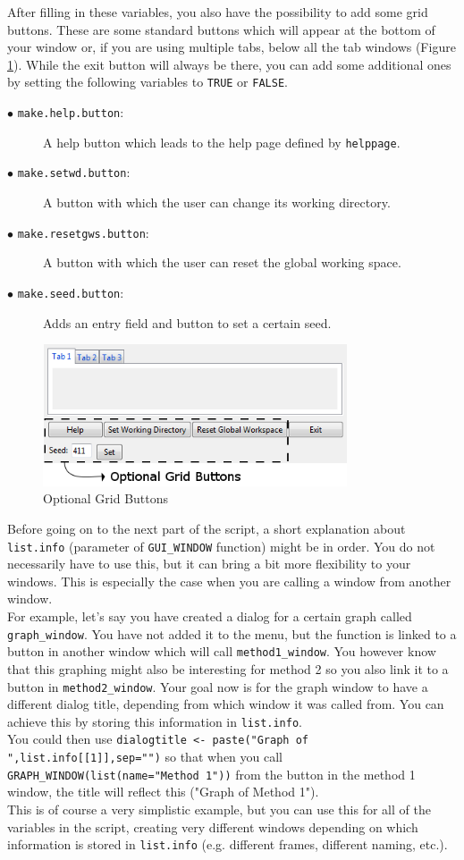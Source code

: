 \documentclass[a4paper]{article}\usepackage[]{graphicx}\usepackage[]{color}
\begin{document}
\noindent After filling in these variables, you also have the possibility to add
some grid buttons. These are some standard buttons which will appear at the
bottom of your window or, if you are using multiple tabs, below all the tab
windows (Figure \ref{optionalgrid}). While the exit button will always be there,
you can add some additional ones by setting the following variables to
\verb|TRUE| or \verb|FALSE|. 
\begin{description}
  \item[$\bullet$ \texttt{make.help.button}:] A help button which leads to the
  help page defined by \verb|helppage|.
  \item[$\bullet$ \texttt{make.setwd.button}:] A button with which the user can
  change its working directory.
  \item[$\bullet$ \texttt{make.resetgws.button}:] A button with which the user
  can reset the global working space.
  \item[$\bullet$ \texttt{make.seed.button}:] Adds an entry field and button to
  set a certain seed.
\end{description}
\begin{figure}[H]
\centering
\includegraphics[width=9cm]{figures/optionalgrid.png}
\caption{Optional Grid Buttons \label{optionalgrid}}
\end{figure}

\noindent Before going on to the next part of the script, a short explanation
about \verb|list.info| (parameter of \verb|GUI_WINDOW| function) might be in
order. You do not necessarily have to use this, but it can bring a bit more
flexibility to your windows. This is especially the case when you are calling
a window from another window.\\
For example, let's say you have created a dialog for a certain graph called
\verb|graph_window|. You have not added it to the menu, but the function is
linked to a button in another window which will call \verb|method1_window|. You
however know that this graphing might also be interesting for method 2 so you
also link it to a button in \verb|method2_window|. Your goal now is for the
graph window to have a different dialog title, depending from which window it
was called from. You can achieve this by storing this information in
\verb|list.info|. \\
You could then use 
\verb|dialogtitle <- paste("Graph of ",list.info[[1]],sep="")| so that when you
call \verb|GRAPH_WINDOW(list(name="Method 1"))| from the button in the method 1
window, the title will reflect this ("Graph of Method 1").\\
This is of course a very simplistic example, but you can use this for all of the
variables in the script, creating very different windows depending on which
information is stored in \verb|list.info| (e.g. different frames, different
naming, etc.).
\end{document}
